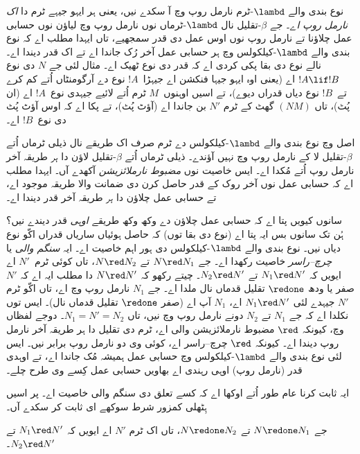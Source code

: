 \documentclass[../../../include/open-logic-section]{subfiles}
\begin{document}
نوع بندی والے $\lambd$-ٹرم نارمل روپ وچ آ سکدے نیں، یعنی ہر ایہو جیہے ٹرم دا \emph{اک نارمل روپ اے}۔ جے $\beta$-تقلیل نال $\lambd$-ٹرماں نوں نارمل روپ وچ لیاؤن نوں حسابی عمل چلاؤنا تے نارمل روپ نوں اوس عمل دی قدر سمجھیے، تاں ایہدا مطلب اے کہ نوع بندی والے $\lambd$-کیلکولس وچ ہر حسابی عمل آخر رُک جاندا اے تے اک قدر دیندا اے۔ نالے نوع دی بقا پکی کردی اے کہ قدر دی نوع ٹھیک اے۔ مثال لئی جے $N$ دی نوع $!A \lif !B$ اے (یعنی اوہ ایہو جیہا فنکشن اے جیہڑا~$!A$ نوع دے آرگومنٹاں اُتے کم کرے تے~$!B$ نوع دیاں قدراں دیوے)، تے اسیں اوہنوں~$M$ ٹرم اُتے لائیے جیہدی نوع~$!A$ اے (ان پُٹ)، تاں $(NM)$ گھٹ کے ٹرم $N'$ بن جاندا اے (آؤٹ پُٹ)، تے پکا اے کہ اوس آؤٹ پُٹ دی نوع~$!B$ اے۔

اصل وچ نوع بندی والے $\lambd$-کیلکولس دے ٹرم صرف اک طریقے نال ذیلی ٹرماں اُتے $\beta$-تقلیل لا کے نارمل روپ وچ نہیں آؤندے۔ ذیلی ٹرماں اُتے $\beta$-تقلیل لاؤن دا \emph{ہر} طریقہ آخر نارمل روپ اُتے مُکدا اے۔ ایس خاصیت نوں \emph{مضبوط نارملائزیشن} آکھدے آں۔ ایہدا مطلب اے کہ حسابی عمل نوں آخر روک کے قدر حاصل کرن دی ضمانت والا طریقہ موجود اے، تے حسابی عمل چلاؤن دا \emph{ہر} طریقہ آخر قدر دیندا اے۔

سانوں کیویں پتا اے کہ حسابی عمل چلاؤن دے وکھ وکھ طریقے \emph{اوہی} قدر دیندے نیں؟ ہُن تک سانوں بس ایہ پتا اے (نوع دی بقا توں) کہ حاصل ہوئیاں ساریاں قدراں اکّو نوع دیاں نیں۔ نوع بندی والے $\lambd$-کیلکولس دی ہور اہم خاصیت اے۔ ایہ \emph{سنگم والی} یا \emph{چرچ–راسر} خاصیت رکھدا اے۔ جے $N \red N_1$ تے $N \red
N_2$، تاں کوئی ٹرم~$N'$ اے ایویں کہ $N_1 \red N'$ تے $N_2 \red
N'$۔ چیتے رکھو کہ $N \red N'$ دا مطلب ایہ اے کہ $N'$ صفر یا ودھ $\redone$ تقلیل قدماں نال ملدا اے۔ جے $N_1$ نارمل روپ وچ اے، تاں اکّو ٹرم $N'$ جیہدے لئی $N_1 \red N'$ اے، $N_1$ آپ اے (صفر $\redone$ تقلیل قدماں نال)۔ ایس توں نکلدا اے کہ جے $N_1$ تے $N_2$ دونے نارمل روپ وچ نیں، تاں $N_1 = N' = N_2$۔ دوجے لفظاں وچ، کیونکہ $\red$ مضبوط نارملائزیشن والی اے، ٹرم دی تقلیل دا ہر طریقہ آخر نارمل روپ دیندا اے۔ کیونکہ $\red$ چرچ–راسر اے، کوئی وی دو نارمل روپ برابر نیں۔ ایس لئی نوع بندی والے $\lambd$-کیلکولس وچ حسابی عمل ہمیشہ مُک جاندا اے، تے اوہدی قدر (نارمل روپ) اوہی رہندی اے بھاویں حسابی عمل کِسے وی طرح چلے۔

ایہ ثابت کرنا عام طور اُتے اوکھا اے کہ کسے تعلق دی سنگم والی خاصیت اے۔ پر اسیں ہِٹھلی کمزور شرط سوکھے ای ثابت کر سکدے آں۔

\begin{prop}
جے $N \redone N_1$ تے $N \redone N_2$، تاں اک ٹرم $N'$ اے ایویں کہ $N_1 \red N'$ تے $N_2 \red N'$۔
\end{prop}
\end{document}
